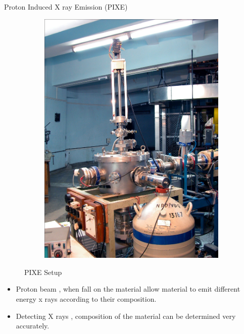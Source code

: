 \documentclass[11pt]{beamer}
\begin{document}
\begin{frame}{Proton Induced X ray Emission (PIXE)}

  \begin{figure}
        \centering
        \begin{subfigure}[b]{0.3\textwidth}
                \includegraphics[width=\textwidth]{Pixe_setup.jpg}
        \end{subfigure}%
               
        \caption{PIXE Setup}\label{fig:PIXE Setup}
\end{figure}
  
  
  \begin{itemize}
    
    \item Proton beam , when fall on the material allow material to emit different energy x rays according to their composition. 
	\item Detecting X rays , composition of the material can be determined very accurately.
		           
   \end{itemize}


\end{frame}
\end{document}
